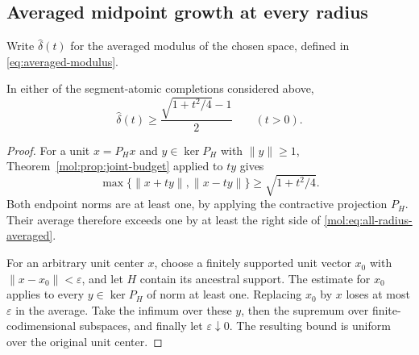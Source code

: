 \subsection{Averaged midpoint growth at every radius}

Write $\widehat\delta(t)$ for the averaged modulus of the chosen
space, defined in \eqref{eq:averaged-modulus}.

\begin{corollary}\label{mol:cor:all-radius-averaged}
In either of the segment-atomic completions considered above,
\begin{equation}\label{mol:eq:all-radius-averaged}
 \widehat\delta(t)\ge
 \frac{\sqrt{1+t^2/4}-1}{2}\qquad(t>0).
\end{equation}
\end{corollary}

\begin{proof}
For a unit $x=P_Hx$ and $y\in\ker P_H$ with $\|y\|\ge1$,
Theorem~\ref{mol:prop:joint-budget} applied to $ty$ gives
\[
 \max\{\|x+ty\|,\|x-ty\|\}\ge\sqrt{1+t^2/4}.
\]
Both endpoint norms are at least one, by applying the contractive
projection $P_H$.  Their average therefore exceeds one by at least
the right side of \eqref{mol:eq:all-radius-averaged}.

For an arbitrary unit center $x$, choose a finitely supported unit
vector $x_0$ with $\|x-x_0\|<\varepsilon$, and let $H$ contain
its ancestral support.  The estimate for $x_0$ applies to every
$y\in\ker P_H$ of norm at least one.  Replacing $x_0$ by $x$
loses at most $\varepsilon$ in the average.  Take the infimum over
these $y$, then the supremum over finite-codimensional subspaces,
and finally let $\varepsilon\downarrow0$.  The resulting bound
is uniform over the original unit center.
\end{proof}

